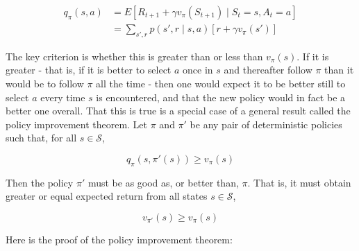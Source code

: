 \documentclass{article}
\begin{document}
\begin{equation*}
\begin{split}
q_{\pi}(s, a)
& = E[R_{t + 1} + \gamma v_{\pi}(S_{t + 1}) \mid S_t = s, A_t = a] \\
& = \sum_{s', r} p(s', r \mid s, a) [r + \gamma v_{\pi}(s')]
\end{split}
\end{equation*}

The key criterion is whether this is greater than or less than \(v_{\pi}(s)\). 
If it is greater - that is, if it is better to select \(a\) once in \(s\) and thereafter follow \(\pi\) than it would be to follow \(\pi\) all the time - 
then one would expect it to be better still to select \(a\) every time \(s\) is encountered, 
and that the new policy would in fact be a better one overall. That this is true is a special case of a general result called the policy improvement theorem. 
Let \(\pi\) and \(\pi'\) be any pair of deterministic policies such that, for all \(s \in \mathcal{S}\),

\[q_{\pi}(s, \pi'(s)) \geq v_{\pi}(s)\]

Then the policy \(\pi'\) must be as good as, or better than, \(\pi\). That is, it must obtain greater or equal expected return from all states \(s \in \mathcal{S}\),

\[v_{\pi'}(s) \geq v_{\pi}(s)\]

Here is the proof of the policy improvement theorem:
\end{document}
